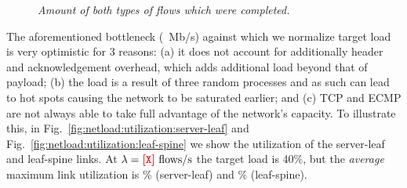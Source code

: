 \begin{figure}
    \centering%
    \hspace*{\fill}%
    \hfill%
    \hspace*{\fill}\vspace{-3pt}%
    \caption{\small \em Amount of both types of flows which were completed.}%
    \label{fig:netload:completed}%
    \vspace{-7pt}%
\end{figure}

 The aforementioned bottleneck (~Mb/s) against which we normalize target load is very optimistic for 3 reasons: (a) it does not account for additionally header and acknowledgement overhead, which adds additional load beyond that of payload; (b) the load is a result of three random processes and as such can lead to hot spots causing the network to be saturated earlier; and (c) TCP and ECMP are not always able to take full advantage of the network's capacity. To illustrate this, in Fig.~\ref{fig:netload:utilization:server-leaf} and Fig.~\ref{fig:netload:utilization:leaf-spine} we show the utilization of the server-leaf and leaf-spine links. At $\lambda=\expincludetext{load-ls-main}{lambda-40.txt}\text{~flows/s}$ the target load is 40\%, but the \textit{average} maximum link utilization is \% (server-leaf) and \% (leaf-spine).

